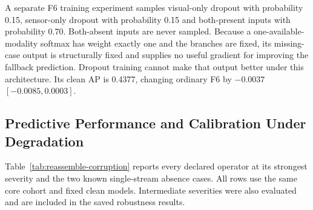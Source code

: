 A separate F6 training experiment samples visual-only dropout with probability 0.15,
sensor-only dropout with probability 0.15 and both-present inputs with probability 0.70.
Both-absent inputs are never sampled. Because a one-available-modality softmax has
weight exactly one and the branches are fixed, its missing-case output is structurally
fixed and supplies no useful gradient for improving the fallback prediction. Dropout
training cannot make that output better under this architecture. Its clean AP is 0.4377,
changing ordinary F6 by $-0.0037$ $[-0.0085, 0.0003]$.

\subsection{Predictive Performance and Calibration Under Degradation}

Table~\ref{tab:reassemble-corruption} reports every declared operator at its strongest
severity and the two known single-stream absence cases. All rows use the same core
cohort and fixed clean models. Intermediate severities were also evaluated and are
included in the saved robustness results.

